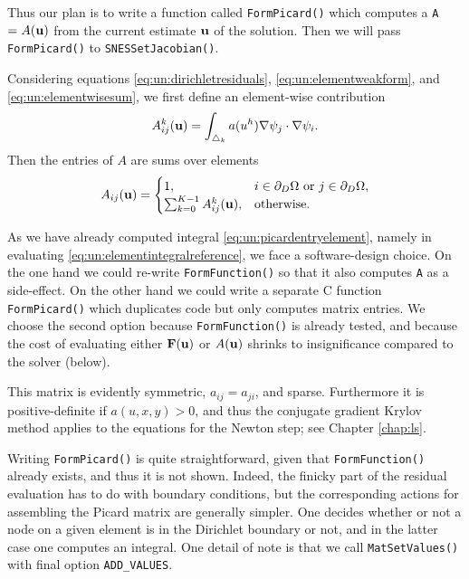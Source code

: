 Thus our plan is to write a function called \texttt{FormPicard()} which computes a \pMat \texttt{A} $=A(\mathbf{u})$ from the current estimate $\mathbf{u}$ of the solution.  Then we will pass \texttt{FormPicard()} to \texttt{SNESSetJacobian()}.

Considering equations \eqref{eq:un:dirichletresiduals}, \eqref{eq:un:elementweakform}, and \eqref{eq:un:elementwisesum}, we first define an element-wise contribution
\begin{equation}
A_{ij}^k(\mathbf{u}) = \int_{\triangle_k} a(u^h) \nabla\psi_j \cdot \nabla\psi_i. \label{eq:un:picardentryelement}
\end{equation}
Then the entries of $A$ are sums over elements
\begin{equation}
A_{ij}(\mathbf{u}) =  \begin{cases}
               1, & i \in \partial_D\Omega \text{ or } j \in \partial_D\Omega, \\
               \sum_{k=0}^{K-1} A_{ij}^k(\mathbf{u}), & \text{otherwise}.
               \end{cases} \label{eq:un:picardentry}
\end{equation}

As we have already computed integral \eqref{eq:un:picardentryelement}, namely in evaluating \eqref{eq:un:elementintegralreference}, we face a software-design choice.  On the one hand we could re-write \texttt{FormFunction()} so that it also computes \texttt{A} as a side-effect.  On the other hand we could write a separate C function \texttt{FormPicard()} which duplicates code but only computes matrix entries.  We choose the second option because \texttt{FormFunction()} is already tested, and because the cost of evaluating either $\mathbf{F}(\mathbf{u})$ or $A(\mathbf{u})$ shrinks to insignificance compared to the solver (below).  

This matrix is evidently symmetric, $a_{ij}=a_{ji}$, and sparse.  Furthermore it is positive-definite if $a(u,x,y)>0$, and thus the conjugate gradient Krylov method applies to the equations for the Newton step; see Chapter \ref{chap:ls}.

Writing \texttt{FormPicard()} is quite straightforward, given that \texttt{FormFunction()} already exists, and thus it is not shown.  Indeed, the finicky part of the residual evaluation has to do with boundary conditions, but the corresponding actions for assembling the Picard matrix are generally simpler.  One decides whether or not a node on a given element is in the Dirichlet boundary or not, and in the latter case one computes an integral.  One detail of note is that we call \texttt{MatSetValues()} with final option \texttt{ADD\_VALUES}.

